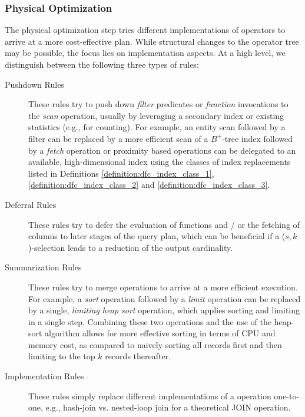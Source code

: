 \subsubsection{Physical Optimization}

The physical optimization step tries different implementations of operators to arrive at a more cost-effective plan. While structural changes to the operator tree may be possible, the focus lies on implementation aspects.  At a high level, we distinguish between the following three types of rules:

\begin{description}
    \item[Pushdown Rules] These rules try to push down \emph{filter} predicates or \emph{function} invocations to the \emph{scan} operation, usually by leveraging a secondary index or existing statistics (e.g., for counting). For example, an entity scan followed by a filter can be replaced by a more efficient scan of a $B^{+}$-tree index followed by a \emph{fetch} operation or proximity based operations can be delegated to an available, high-dimensional index using the classes of index replacements listed in Definitions \ref{definition:dfc_index_class_1}, \ref{definition:dfc_index_class_2} and \ref{definition:dfc_index_class_3}.
 
    \item[Deferral Rules] These rules try to defer the evaluation of functions and / or the fetching of columns to later stages of the query plan, which can be beneficial if a ($s,k$)-selection leads to a reduction of the output cardinality.

    \item[Summarization Rules] These rules try to merge operations to arrive at a more efficient execution. For example, a \emph{sort} operation followed by a \emph{limit} operation can be replaced by a single, \emph{limiting heap sort} operation, which applies sorting and limiting in a single step. Combining these two operations and the use of the heap-sort algorithm allows for more effective sorting in terms of CPU and memory cost, as compared to naively sorting all records first and then limiting to the top $k$ records thereafter.
    
    \item[Implementation Rules] These rules simply replace different implementations of a operation one-to-one, e.g., hash-join vs. nested-loop join for a theoretical JOIN operation.
\end{description}

